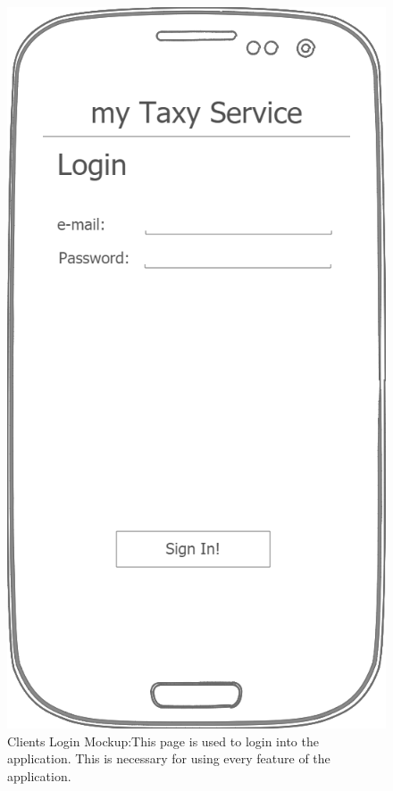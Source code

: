 \documentclass[a4paper]{article}
\begin{document}
\begin{enumerate}[label=\bfseries G\arabic*:]
\begin{figure}[H]
\includegraphics[width=\mockupWidth]{Mockup-ClientsLogin}
\centering
\caption[Clients Login Mockup]{Clients Login Mockup:\newline This page is used to login into the application. This is necessary for using every feature of the application.}
\label{fig:mockupclientlogin}
\end{figure}


\end{enumerate}
\end{document}
